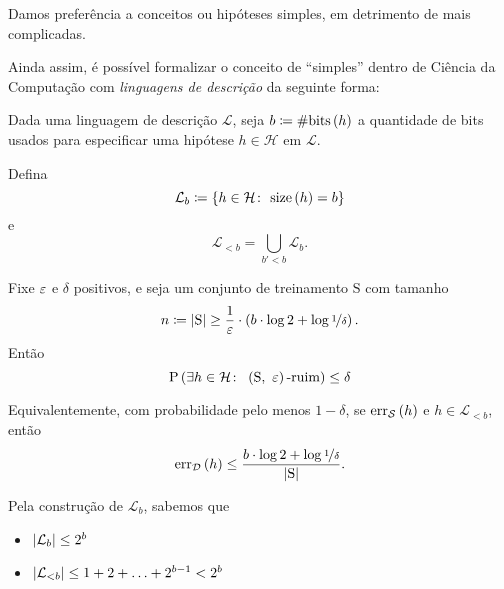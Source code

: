 \begin{afirmacao}
  \label{afr:navalha_de_occam}
  Damos preferência a conceitos ou hipóteses simples, em detrimento de mais complicadas.
\end{afirmacao}

Ainda assim, é possível formalizar o conceito de ``simples'' dentro de Ciência da Computação com \textit{linguagens de descrição} da seguinte forma:
\begin{teorema}
  \label{teo:navalha_de_occam}
  Dada uma linguagem de descrição $\mathcal{L}$, seja $b\coloneqq\#\mathrm{bits}\left(h\vphantom{1j}\right)$ a quantidade de bits usados para especificar uma hipótese $h\in\mathcal{H}$ em $\mathcal{L}$.

  Defina
  \[
    \mathcal{L}_b\coloneqq\left\{h\in\mathcal{H}\colon\ \mathrm{size}\left(h\vphantom{1j}\right)=b\vphantom{1j}\right\}
  \]
  e
  \[ 
    \mathcal{L}_{<b} = \bigcup_{b'<b} \mathcal{L}_b.
  \]

  Fixe $\varepsilon$ e $\delta$ positivos, e seja um conjunto de treinamento $\mathrm{S}$ com tamanho
  \[
    n \coloneqq \left|\mathrm{S}\vphantom{1j}\right| \geq \frac{1}{\varepsilon}\cdot\left(b\cdot\log2 + \log\nicefrac{1}{\delta}\vphantom{1j}\right).
  \]
  Então
  \[
    \mathrm{P}\left(\exists h\in\mathcal{H}\colon\ \left(\mathrm{S},\ \eps\vphantom{1j}\right)\text{-ruim}\vphantom{1j}\right) \leq \delta
  \]

  Equivalentemente, com probabilidade pelo menos $1-\delta$, se $\mathrm{err}_\mathcal{S}\left(h\vphantom{1j}\right)$ e $h\in\mathcal{L}_{<b}$, então
  \[
    \mathrm{err}_\mathcal{D}\left(h\vphantom{1j}\right) \leq \frac{b\cdot\log2 + \log\nicefrac{1}{\delta}}{\left|\mathrm{S}\vphantom{1j}\right|}.
  \]
\end{teorema}

\begin{observacao}
  Pela construção de $\mathcal{L}_b$, sabemos que
  \begin{itemize}
    \item $\left|\mathcal{L}_b\vphantom{1j}\right| \leq 2^b$
    \item $\left|\mathcal{L}_{<b}\vphantom{1j}\right| \leq 1 + 2 + \ldots + 2^{b-1} < 2^b$
  \end{itemize}
\end{observacao}

